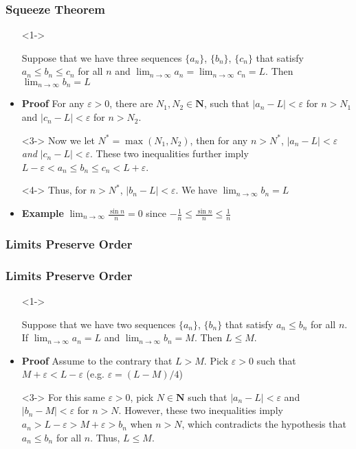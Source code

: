 \documentclass[handout]{beamer}
\begin{document}
\frame
{
  \frametitle{Squeeze Theorem}

  \begin{itemize}
  \item [] <1-> \begin{Theorem}Suppose that we have three sequences $\{a_n\}$, $\{b_n\}$, $\{c_n\}$ that satisfy $a_n\leq b_n\leq c_n$ for all $n$ and $\lim_{n\rightarrow \infty} a_n=\lim_{n\rightarrow \infty} c_n=L.$ Then $\lim_{n\rightarrow \infty} b_n=L$
  \end{Theorem}
  
  \item<2-> \textbf{Proof} For any $\varepsilon>0$, there are $N_1, N_2\in \mathbf{N}$, such that $|a_n-L|<\varepsilon$ for $n>N_1$ and $|c_n-L|<\varepsilon$ for $n>N_2$. 
        \item[]<3-> Now we let $N^*=\max(N_1, N_2)$, then for any $n>N^*$, $|a_n-L|<\varepsilon$ \textit{ and } $|c_n-L|<\varepsilon$. These two inequalities further imply $L-\varepsilon <a_n\leq b_n\leq c_n<L+\varepsilon$. 

        \item[]<4-> Thus, for $n>N^*$, $|b_n-L|<\varepsilon$. We have $\lim_{n\rightarrow \infty} b_n=L$
        

  \item <5->  \textbf{Example} $\lim_{n\rightarrow \infty} \frac{\sin n}{n}=0$ since $ -\frac{1}{n}\leq \frac{\sin n}{n}\leq \frac{1}{n}$  
             
  \end{itemize}
}



\subsubsection{Limits Preserve Order}

\frame
{
  \frametitle{Limits Preserve Order}

  \begin{itemize}
  \item [] <1-> \begin{Theorem}Suppose that we have two sequences $\{a_n\}$, $\{b_n\}$ that satisfy $a_n\leq b_n$ for all $n$. If $\lim_{n\rightarrow \infty} a_n=L$ and $\lim_{n\rightarrow \infty} b_n=M.$ Then $L\leq M$.
  \end{Theorem}
  
  \item<2-> \textbf{Proof} Assume to the contrary that $L>M$. Pick $\varepsilon>0$ such that $M+\varepsilon< L-\varepsilon$ (e.g. $\varepsilon=(L-M)/4$)
  
     \item[]<3-> For this same $\varepsilon>0$, pick $N\in\mathbf{N}$ such that $|a_n-L|<\varepsilon$  and $|b_n-M|<\varepsilon$ for $n>N$.  However, these two inequalities imply $a_n>L-\varepsilon>M+\varepsilon>b_n$ when $n>N$, which contradicts the hypothesis that $a_n\leq b_n$ for all $n$. Thus, $L\leq M$. 
                  
  \end{itemize}
}
\end{document}
